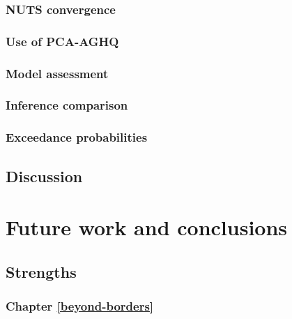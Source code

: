 \documentclass[a4paper, nobind]{templates/ociamthesis}
\begin{document}
\hypertarget{nuts-convergence}{%
\subsection{NUTS convergence}\label{nuts-convergence}}

\hypertarget{use-of-pca-aghq}{%
\subsection{Use of PCA-AGHQ}\label{use-of-pca-aghq}}

\hypertarget{model-assessment}{%
\subsection{Model assessment}\label{model-assessment}}

\hypertarget{inference-comparison}{%
\subsection{Inference comparison}\label{inference-comparison}}

\hypertarget{exceedance-probabilities}{%
\subsection{Exceedance probabilities}\label{exceedance-probabilities}}

\hypertarget{discussion-2}{%
\section{Discussion}\label{discussion-2}}

\hypertarget{conclusions}{%
\chapter{Future work and conclusions}\label{conclusions}}

\adjustmtc
{}

\hypertarget{strengths}{%
\section{Strengths}\label{strengths}}

\hypertarget{chapter-refbeyond-borders}{%
\subsection{Chapter \ref{beyond-borders}}\label{chapter-refbeyond-borders}}
\end{document}
